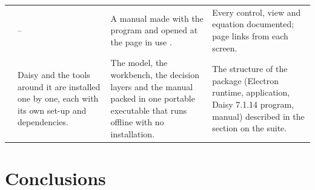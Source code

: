\documentclass[preprint,12pt]{elsarticle}
\begin{document}
{\begin{longtable}{@{}>{\raggedright\arraybackslash}p{0.4cm}>{\raggedright\arraybackslash}p{4.5cm}>{\raggedright\arraybackslash}p{5.4cm}>{\raggedright\arraybackslash}p{5.0cm}@{}}
6 & -- & A manual made with the program and opened at the page in use \cite{HaliluManual}. & Every control, view and equation documented; page links from each screen.\\
7 & Daisy and the tools around it are installed one by one, each with its own set-up and dependencies. & The model, the workbench, the decision layers and the manual packed in one portable executable that runs offline with no installation. & The structure of the package (Electron runtime, application, Daisy 7.1.14 program, manual) described in the section on the suite.\\
\bottomrule
\end{longtable}}


\section{Conclusions}
\end{document}
